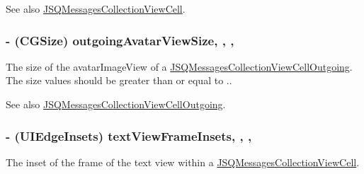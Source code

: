 \begin{DoxySeeAlso}{See also}
\hyperlink{interface_j_s_q_messages_collection_view_cell}{J\+S\+Q\+Messages\+Collection\+View\+Cell}. 
\end{DoxySeeAlso}
\hypertarget{interface_j_s_q_messages_collection_view_layout_attributes_a91ee2dc3a373791c2e4d276d4b4248b1}{}
\subsubsection[{outgoing\+Avatar\+View\+Size}]{\setlength{\rightskip}{0pt plus 5cm}-\/ (C\+G\+Size) outgoing\+Avatar\+View\+Size\hspace{0.3cm}{\ttfamily [read]}, {\ttfamily [write]}, {\ttfamily [nonatomic]}, {\ttfamily [assign]}}\label{interface_j_s_q_messages_collection_view_layout_attributes_a91ee2dc3a373791c2e4d276d4b4248b1}
The size of the {\ttfamily avatar\+Image\+View} of a {\ttfamily \hyperlink{interface_j_s_q_messages_collection_view_cell_outgoing}{J\+S\+Q\+Messages\+Collection\+View\+Cell\+Outgoing}}. The size values should be greater than or equal to {.}.

\begin{DoxySeeAlso}{See also}
{\ttfamily \hyperlink{interface_j_s_q_messages_collection_view_cell_outgoing}{J\+S\+Q\+Messages\+Collection\+View\+Cell\+Outgoing}}. 
\end{DoxySeeAlso}
\hypertarget{interface_j_s_q_messages_collection_view_layout_attributes_aa39b84f61717c6f161cf38e7e3dfc169}{}
\subsubsection[{text\+View\+Frame\+Insets}]{\setlength{\rightskip}{0pt plus 5cm}-\/ (U\+I\+Edge\+Insets) text\+View\+Frame\+Insets\hspace{0.3cm}{\ttfamily [read]}, {\ttfamily [write]}, {\ttfamily [nonatomic]}, {\ttfamily [assign]}}\label{interface_j_s_q_messages_collection_view_layout_attributes_aa39b84f61717c6f161cf38e7e3dfc169}
The inset of the frame of the text view within a {\ttfamily \hyperlink{interface_j_s_q_messages_collection_view_cell}{J\+S\+Q\+Messages\+Collection\+View\+Cell}}.

